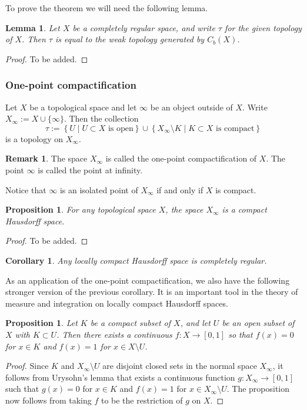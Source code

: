 \documentclass[11pt,a4paper]{article}
\theoremstyle{definition}
\newtheorem{remark}{Remark}[section]
\theoremstyle{plain}
\newtheorem{proposition}[theorem]{Proposition}
\newtheorem{lemma}[theorem]{Lemma}
\newtheorem{corollary}[theorem]{Corollary}
\newcommand{\set}[2]{ \left\{ #1 \mid #2 \right\} }
\begin{document}
  To prove the theorem we will need the following lemma.

  \begin{lemma}
    Let $X$ be a completely regular space, and write $\tau$ for the given
    topology of $X$.
    Then $\tau$ is equal to the weak topology generated by $C_b(X)$.
  \end{lemma}
  \begin{proof}
    To be added.
  \end{proof}

  \subsubsection{One-point compactification}

  Let $X$ be a topological space and let $\infty$ be an object outside of $X$.
  Write $X_{\infty} := X \cup \{\infty\}$. Then the collection
  \[
    \tau :=
    \set{U}{\text{$U \subset X$ is open}} \cup
    \set{X_{\infty} \setminus K}{\text{$K \subset X$ is compact}}
  \]
  is a topology on $X_{\infty}$.

  \begin{remark}
    The space $X_{\infty}$ is called the one-point compactification of $X$.
    The point $\infty$ is called the point at infinity.
  \end{remark}

  Notice that $\infty$ is an isolated point of $X_{\infty}$ if and only if
  $X$ is compact.

  \begin{proposition}
    For any topological space $X$, the space $X_{\infty}$ is a compact
    Hausdorff space.
  \end{proposition}
  \begin{proof}
    To be added.
  \end{proof}
  
  \begin{corollary}
    Any locally compact Hausdorff space is completely regular.
  \end{corollary}
  
  As an application of the one-point compactification,
  we also have the following stronger version of the previous corollary.
  It is an important tool in the theory of measure and integration on 
  locally compact Hausdorff spaces.

  \begin{proposition}
    Let $K$ be a compact subset of $X$, and let $U$ be an open subset
    of $X$ with $K \subset U$.
    Then there exists a continuous $f \colon X \to [0, 1]$ so that 
    $f(x) = 0$ for $x \in K$ and $f(x) = 1$ for $x \in X \setminus U$.
  \end{proposition}
  \begin{proof}
    Since $K$ and $X_{\infty} \setminus U$ are disjoint closed sets in the
    normal space $X_{\infty}$, it follows from Urysohn's lemma that
    exists a continuous function $g \colon X_{\infty} \to [0,1]$ such that 
    $g(x) = 0$ for $x \in K$ and $f(x) = 1$ for $x \in X_{\infty} \setminus U$.
    The proposition now follows from taking $f$ to be the restriction of
    $g$ on $X$.
  \end{proof}
\end{document}
